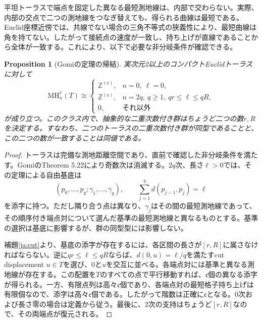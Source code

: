 \documentclass[12pt]{amsart}
\newcommand{\PropositionName}{Proposition}
\newtheorem{prop}[thm]{\PropositionName}
\theoremstyle{definition}
\theoremstyle{remark}
\numberwithin{equation}{section}
\newcommand{\Z}{\mathbb{Z}}
\newcommand{\MH}{\mathrm{MH}}
\begin{document}
平坦トーラスで端点を固定した異なる最短測地線は、内部で交わらない。実際、内部の交点で二つの測地線をつなぎ替えても、得られる曲線は最短である。Euclid座標近傍では、共線でない場合の三角不等式の狭義性により、最短曲線は角を持てない。したがって接続点の速度が一致し、持ち上げが直線であることから全体が一致する。これにより、以下で必要な非分岐条件が確認できる。

\begin{prop}[Gomiの定理の帰結]\label{ja:flat}
実次元2以上のコンパクトEuclidトーラスに対して
\begin{equation}\label{ja:flatformula}
\MH_n^\ell(T)\cong
\begin{cases}
\Z^{(\mathfrak c)},&n=0,\ \ell=0,\\
\Z^{(\mathfrak c)},&n=2q,\ q\geq1,\ qr\leq\ell\leq qR,\\
0,&\text{それ以外}
\end{cases}
\end{equation}
が成り立つ。このクラス内で、抽象的な二重次数付き群はちょうど二つの数$r,R$を決定する。すなわち、二つのトーラスの二重次数付き群が同型であることと、この二つの数が一致することは同値である。
\end{prop}
\begin{proof}
トーラスは完備な測地距離空間であり、直前で確認した非分岐条件を満たす。GomiのTheorem 5.22により奇数次は消滅する。$2q$次、長さ$\ell>0$では、その定理による自由基底は
\begin{equation}\label{ja:gomiindex}
(p_0,\ldots,p_q;\gamma_1,\ldots,\gamma_q),\qquad
\sum_{j=1}^q d(p_{j-1},p_j)=\ell
\end{equation}
を添字に持つ。ただし隣り合う点は異なり、$\gamma_j$はその間の最短測地線であって、その順序付き端点対について選んだ基準の最短測地線と異なるものとする。基準の選択は基底に影響するが、群の同型型には影響しない。

補題\ref{ja:cut}より、基底の添字が存在するには、各区間の長さが$[r,R]$に属さなければならない。逆に$qr\leq\ell\leq qR$ならば、$d(0,u)=\ell/q$を満たすcut displacement $u\in T$を選び、$0$と$u$を交互に並べる。各端点対には基準と異なる測地線が存在する。この配置を$T$のすべての点で平行移動すれば、$\mathfrak c$個の異なる添字が得られる。一方、有限点列は高々$\mathfrak c$個であり、各端点対の最短格子持ち上げは有限個なので、添字は高々$\mathfrak c$個である。したがって階数は正確に$\mathfrak c$となる。0次および長さ零の場合は定義から従う。最後に、2次の支持はちょうど$[r,R]$なので、その両端点が復元される。
\end{proof}
\end{document}
